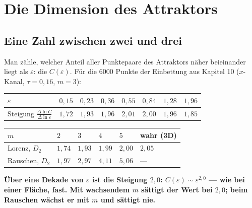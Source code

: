 \chapter{Die Dimension des Attraktors}

\section{Eine Zahl zwischen zwei und drei}

\begin{merksatz}
Man zähle, welcher Anteil aller Punktepaare des Attraktors näher beieinander liegt als $\varepsilon$: die  $C(\varepsilon)$. Für die $6000$ Punkte der Einbettung aus Kapitel 10 ($x$-Kanal, $\tau = 0{,}16$, $m = 3$):

\begin{center}
{\small
\renewcommand{\arraystretch}{1.46}
\begin{tabular}{@{}P{2.4cm}P{0.9cm}P{0.9cm}P{0.9cm}P{0.9cm}P{0.9cm}P{0.9cm}P{0.9cm}@{}}
\toprule
$\varepsilon$ & $0{,}15$ & $0{,}23$ & $0{,}36$ & $0{,}55$ & $0{,}84$ & $1{,}28$ & $1{,}96$\\
\midrule
Steigung $\frac{\Delta\ln C}{\Delta\ln\varepsilon}$ & $1{,}72$ & $1{,}93$ & $1{,}96$ & $2{,}01$ & $2{,}00$ & $1{,}96$ & $1{,}85$\\
\bottomrule
\end{tabular}}
\end{center}

\begin{center}
{\small
\renewcommand{\arraystretch}{1.46}
\begin{tabular}{@{}P{2.6cm}P{1.0cm}P{1.0cm}P{1.0cm}P{1.0cm}P{1.6cm}@{}}
\toprule
$m$ & $2$ & $3$ & $4$ & $5$ & \textbf{wahr (3D)}\\
\midrule
Lorenz, $D_2$ & $1{,}74$ & $1{,}93$ & $1{,}99$ & $2{,}00$ & $2{,}05$\\
Rauschen, $D_2$ & $1{,}97$ & $2{,}97$ & $4{,}11$ & $5{,}06$ & ---\\
\bottomrule
\end{tabular}}
\end{center}

\begin{center}
\begin{minipage}{0.9\textwidth}
\textbf{Über eine Dekade von $\varepsilon$ ist die Steigung $2{,}0$: $C(\varepsilon)\sim\varepsilon^{2{,}0}$ --- wie bei einer Fläche, fast. Mit wachsendem $m$ sättigt der Wert bei $2{,}0$; beim Rauschen wächst er mit $m$ und sättigt nie.}
\end{minipage}
\end{center}


\end{merksatz}
